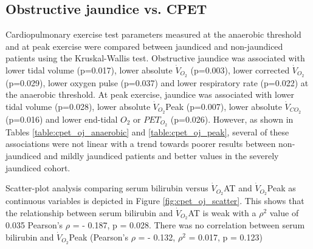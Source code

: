 \subsection{Obstructive jaundice vs. CPET}
Cardiopulmonary exercise test parameters measured at the anaerobic threshold and at peak exercise were compared between jaundiced and non-jaundiced patients using the Kruskal-Wallis test. 
Obstructive jaundice was associated with lower tidal volume (p=0.017), lower absolute $\dot{V}_{O_2}$ (p=0.003), lower corrected $\dot{V}_{O_2}$ (p=0.029), lower oxygen pulse (p=0.037) and lower respiratory rate (p=0.022) at the anaerobic threshold.
At peak exercise, jaundice was associated with lower tidal volume (p=0.028), lower absolute $\dot{V}_{O_2}$Peak (p=0.007), lower absolute $\dot{V}_{CO_2}$ (p=0.016) and lower end-tidal $O_2$ or $PET_{O_2}$ (p=0.026). 
However, as shown in Tables \ref{table:cpet_oj_anaerobic} and \ref{table:cpet_oj_peak}, several of these associations were not linear with a trend towards poorer results between non-jaundiced and mildly jaundiced patients and better values in the severely jaundiced cohort. 




Scatter-plot analysis comparing serum bilirubin versus $\dot{V}_{O_2}$AT and $\dot{V}_{O_2}$Peak as continuous variables is depicted in Figure \ref{fig:cpet_oj_scatter}. 
This shows that the relationship between serum bilirubin and $\dot{V}_{O_2}$AT is weak with a $\rho^2$ value of 0.035 Pearson's $\rho$ = - 0.187, p = 0.028. 
There was no correlation between serum bilirubin and $\dot{V}_{O_2}$Peak (Pearson's $\rho$ = - 0.132, $\rho^2$ = 0.017, p = 0.123)

